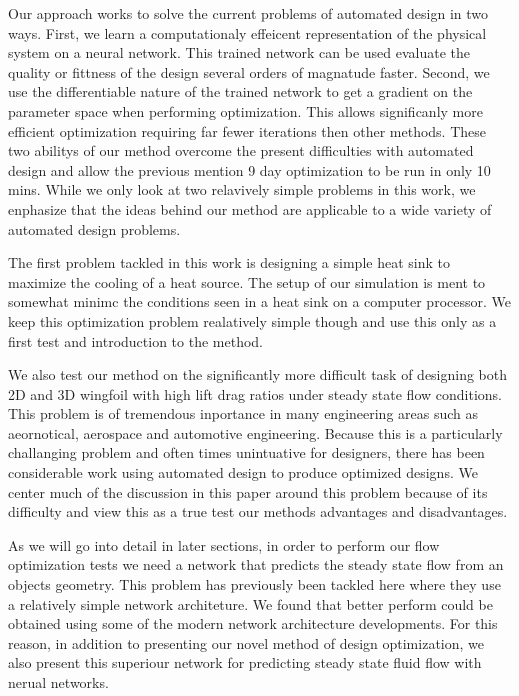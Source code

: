 \documentclass{article} %
\begin{document}
Our approach works to solve the current problems of automated design in two ways. First, we learn a computationaly effeicent representation of the physical system on a neural network. This trained network can be used evaluate the quality or fittness of the design several orders of magnatude faster. Second, we use the differentiable nature of the trained network to get a gradient on the parameter space when performing optimization. This allows significanly more efficient optimization requiring far fewer iterations then other methods. These two abilitys of our method overcome the present difficulties with automated design and allow the previous mention 9 day optimization to be run in only 10 mins. While we only look at two relavively simple problems in this work, we enphasize that the ideas behind our method are applicable to a wide variety of automated design problems.

The first problem tackled in this work is designing a simple heat sink to maximize the cooling of a heat source. The setup of our simulation is ment to somewhat minimc the conditions seen in a heat sink on a computer processor. We keep this optimization problem realatively simple though and use this only as a first test and introduction to the method.

We also test our method on the significantly more difficult task of designing both 2D and 3D wingfoil with high lift drag ratios under steady state flow conditions. This problem is of tremendous inportance in many engineering areas such as aeornotical, aerospace and automotive engineering. Because this is a particularly challanging problem and often times unintuative for designers, there has been considerable work using automated design to produce optimized designs. We center much of the discussion in this paper around this problem because of its difficulty and view this as a true test our methods advantages and disadvantages.

As we will go into detail in later sections, in order to perform our flow optimization tests we need a network that predicts the steady state flow from an objects geometry. This problem has previously been tackled here where they use a relatively simple network architeture. We found that better perform could be obtained using some of the modern network architecture developments. For this reason, in addition to presenting our novel method of design optimization, we also present this superiour network for predicting steady state fluid flow with nerual networks.
\end{document}
